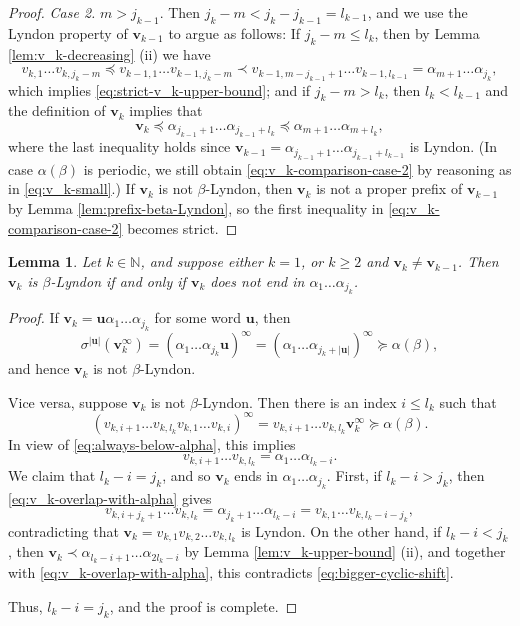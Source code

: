 \documentclass[11pt]{amsart}
\newtheorem{lemma}[theorem]{Lemma}
\theoremstyle{definition}
\theoremstyle{remark}
\numberwithin{equation}{section}
\newcommand{\N}{\ensuremath{\mathbb{N}}}
\renewcommand{\u}{\mathbf{u}}
\renewcommand{\v}{\mathbf{v}}
\newcommand{\f}{\infty}
\newcommand{\al}{\alpha}
\newcommand{\lle}{\preccurlyeq}
\newcommand{\lge}{\succcurlyeq}
\newcommand{\si}{\sigma}
\begin{document}
\begin{proof}
\medskip
{\em Case 2.} $m>j_{k-1}$. Then $j_k-m<j_k-j_{k-1}=l_{k-1}$, and we use the Lyndon property of $\v_{k-1}$ to argue as follows: If $j_k-m\leq l_k$, then by Lemma \ref{lem:v_k-decreasing} (ii) we have
\[
v_{k,1}\dots v_{k,j_k-m}\lle v_{k-1,1}\dots v_{k-1,j_k-m} \prec v_{k-1,m-j_{k-1}+1}\dots v_{k-1,l_{k-1}}=\al_{m+1}\dots\al_{j_k},
\]
which implies \eqref{eq:strict-v_k-upper-bound}; and if $j_k-m>l_k$, then {$l_k<l_{k-1}$ and the definition of $\v_k$ implies that 
\begin{equation} \label{eq:v_k-comparison-case-2}
\v_k\lle \al_{j_{k-1}+1}\ldots \al_{j_{k-1}+l_k}\lle \al_{m+1}\ldots \al_{m+l_k},
\end{equation}
where the last inequality holds since $\v_{k-1}=\al_{j_{k-1}+1}\ldots \al_{j_{k-1}+l_{k-1}}$ is Lyndon. (In case $\al(\beta)$ is periodic, we still obtain \eqref{eq:v_k-comparison-case-2} by reasoning as in \eqref{eq:v_k-small}.) If $\v_k$ is not $\beta$-Lyndon, then $\v_k$ is not a proper prefix of $\v_{k-1}$ by Lemma \ref{lem:prefix-beta-Lyndon}, so the first inequality in \eqref{eq:v_k-comparison-case-2} becomes strict.}
\end{proof}

\begin{lemma} \label{lem:v_k-beta-Lyndon}
Let $k\in\N$, and suppose either $k=1$, or $k\geq 2$ and $\v_k\neq\v_{k-1}$. Then $\v_k$ is $\beta$-Lyndon if and only if $\v_k$ does not end in $\al_1\dots\al_{j_k}$.
\end{lemma}

\begin{proof}
If $\v_k=\u \al_1\dots\al_{j_k}$ for some word $\u$, then
\[
\si^{|\u|}(\v_k^\f)=(\al_1\dots\al_{j_k}\u)^\f=(\al_1\dots\al_{j_k+|\u|})^\f\lge\al(\beta),
\]
and hence $\v_k$ is not $\beta$-Lyndon.

Vice versa, suppose $\v_k$ is not $\beta$-Lyndon. Then there is an index $i\leq l_k$ such that
\begin{equation} \label{eq:bigger-cyclic-shift}
(v_{k,i+1}\dots v_{k,l_k}v_{k,1}\dots v_{k,i})^\f = v_{k,i+1}\dots v_{k,l_k}\v_k^\f\lge \al(\beta).
\end{equation}
In view of \eqref{eq:always-below-alpha}, this implies
\begin{equation} \label{eq:v_k-overlap-with-alpha}
v_{k,i+1}\dots v_{k,l_k}=\al_1\dots\al_{l_k-i}.
\end{equation}
We claim that $l_k-i=j_k$, and so $\v_k$ ends in $\al_1\dots\al_{j_k}$.
First, if $l_k-i>j_k$, then \eqref{eq:v_k-overlap-with-alpha} gives
\[
v_{k,i+j_k+1}\dots v_{k,l_k}=\al_{j_k+1}\dots\al_{l_k-i}=v_{k,1}\dots v_{k,l_k-i-j_k},
\]
contradicting that $\v_k=v_{k,1}v_{k,2}\ldots v_{k,l_k}$ is Lyndon. On the other hand, if $l_k-i<j_k$, then $\v_k\prec \al_{l_k-i+1}\dots\al_{2l_k-i}$ by Lemma \ref{lem:v_k-upper-bound} (ii), and together with \eqref{eq:v_k-overlap-with-alpha}, this contradicts \eqref{eq:bigger-cyclic-shift}.

Thus, $l_k-i=j_k$, and the proof is complete.
\end{proof}
\end{document}
